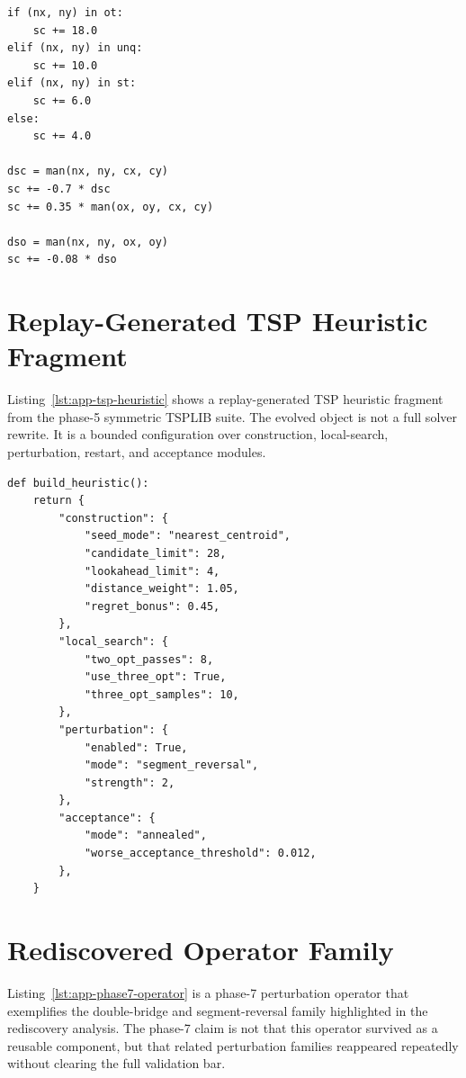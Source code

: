 \begin{lstlisting}[caption={Rejected territory-control novelty spike from the replay-aware transfer audit.},label={lst:app-game-churn}]
if (nx, ny) in ot:
    sc += 18.0
elif (nx, ny) in unq:
    sc += 10.0
elif (nx, ny) in st:
    sc += 6.0
else:
    sc += 4.0

dsc = man(nx, ny, cx, cy)
sc += -0.7 * dsc
sc += 0.35 * man(ox, oy, cx, cy)

dso = man(nx, ny, ox, oy)
sc += -0.08 * dso
\end{lstlisting}

\section{Replay-Generated TSP Heuristic Fragment}
\label{sec:appendix-tsp-heuristic}

Listing~\ref{lst:app-tsp-heuristic} shows a replay-generated TSP heuristic fragment from the
phase-5 symmetric TSPLIB suite. The evolved object is not a full solver rewrite. It is a bounded
configuration over construction, local-search, perturbation, restart, and acceptance modules.

\begin{lstlisting}[caption={Phase-5 replay-generated TSP heuristic fragment.},label={lst:app-tsp-heuristic}]
def build_heuristic():
    return {
        "construction": {
            "seed_mode": "nearest_centroid",
            "candidate_limit": 28,
            "lookahead_limit": 4,
            "distance_weight": 1.05,
            "regret_bonus": 0.45,
        },
        "local_search": {
            "two_opt_passes": 8,
            "use_three_opt": True,
            "three_opt_samples": 10,
        },
        "perturbation": {
            "enabled": True,
            "mode": "segment_reversal",
            "strength": 2,
        },
        "acceptance": {
            "mode": "annealed",
            "worse_acceptance_threshold": 0.012,
        },
    }
\end{lstlisting}

\section{Rediscovered Operator Family}
\label{sec:appendix-phase7-operator}

Listing~\ref{lst:app-phase7-operator} is a phase-7 perturbation operator that exemplifies the
double-bridge and segment-reversal family highlighted in the rediscovery analysis. The phase-7
claim is not that this operator survived as a reusable component, but that related perturbation
families reappeared repeatedly without clearing the full validation bar.

